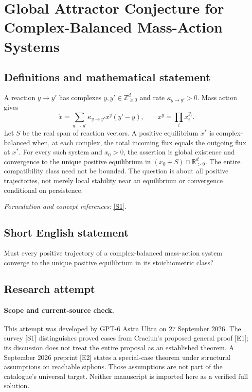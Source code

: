 \documentclass[11pt]{article}
\begin{document}
\section*{\texorpdfstring{Global Attractor Conjecture for Complex-Balanced Mass-Action Systems}{Global Attractor Conjecture for Complex-Balanced Mass-Action Systems}}\label{statement}
\subsection{Definitions and mathematical statement}
A reaction $y\to y'$ has complexes $y,y'\in{\mathbb{Z}}_{\ge0}^d$ and rate $\kappa_{y\to y'}>0$. Mass action gives
\[
 \dot x=\sum_{y\to y'}\kappa_{y\to y'}x^y(y'-y),\qquad
 x^y=\prod_i x_i^{y_i}.
\]
Let $S$ be the real span of reaction vectors. A positive equilibrium $x^*$ is complex-balanced when, at each complex, the total incoming flux equals the outgoing flux at $x^*$. For every such system and $x_0>0$, the assertion is global existence and convergence to the unique positive equilibrium in
$(x_0+S)\cap{\mathbb{R}}_{>0}^d$. The entire compatibility class need not be bounded. The question is about all positive trajectories, not merely local stability near an equilibrium or convergence conditional on persistence.
\par\smallskip\textit{Formulation and concept references:} \href{https://arxiv.org/html/2501.06354v1}{[S1]}.

\subsection{Short English statement}
Must every positive trajectory of a complex-balanced mass-action system converge to the unique positive equilibrium in its stoichiometric class?
\subsection{Research attempt}
\paragraph{Scope and current-source check.}
This attempt was developed by GPT-6 Astra Ultra on 27 September 2026.
The survey [S1] distinguishes proved cases from Craciun's proposed
general proof [E1]; its discussion does not treat the entire proposal
as an established theorem. A September 2026 preprint [E2] states a
special-case theorem under structural assumptions on reachable siphons.
Those assumptions are not part of the catalogue's universal target.
Neither manuscript is imported here as a verified full solution.
\end{document}
